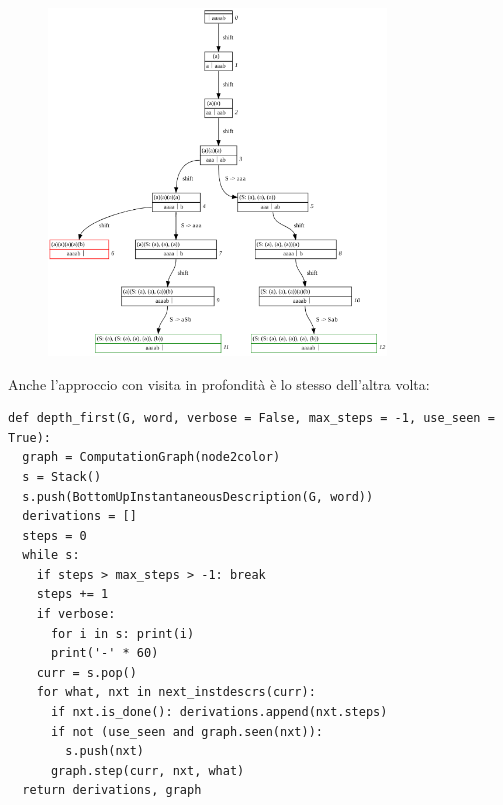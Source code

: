 \begin{figure}[ht!]
  \centering
  \includegraphics[width=0.8\textwidth]{images/Parsing/bottom_up_breadth.png}
\end{figure}

\newpage

Anche l'approccio con visita in profondità è lo stesso dell'altra volta:
\begin{lstlisting}
def depth_first(G, word, verbose = False, max_steps = -1, use_seen = True):
  graph = ComputationGraph(node2color)
  s = Stack()
  s.push(BottomUpInstantaneousDescription(G, word))
  derivations = []
  steps = 0
  while s:
    if steps > max_steps > -1: break
    steps += 1
    if verbose:
      for i in s: print(i)
      print('-' * 60)
    curr = s.pop()
    for what, nxt in next_instdescrs(curr):
      if nxt.is_done(): derivations.append(nxt.steps)
      if not (use_seen and graph.seen(nxt)): 
        s.push(nxt)  
      graph.step(curr, nxt, what)
  return derivations, graph
\end{lstlisting}

